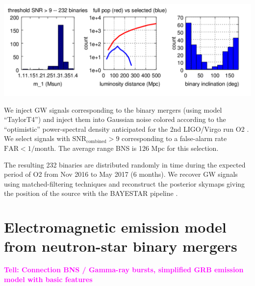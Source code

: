 \documentclass[a0,portrait]{a0poster}
\newcommand{\ECM}[1] {\textbf{\textcolor{magenta}{#1}}}
\begin{document}
\begin{multicols}{2}
\begin{center}\vspace{.5cm}
    \includegraphics[width=30cm]{figures/summary_plot.png}
\end{center}

We inject GW signals corresponding to the binary mergers (using model
``TaylorT4'') and inject them into Gaussian noise colored according to the
``optimistic'' power-spectral density anticipated for the 2nd LIGO/Virgo run O2
\cite{lrr-2016-1}. We select signals with $\mathrm{SNR}_{\mathrm{combined}} > 9$
corresponding to a false-alarm rate $\mathrm{FAR} < 1/\mathrm{month}$. The average range
BNS is 126 Mpc for this selection.

The resulting 232 binaries are distributed randomly in time during the expected
period of O2 from Nov 2016 to May 2017 (6 months). We recover GW signals using
matched-filtering techniques and reconstruct the posterior skymaps giving the
position of the source with the BAYESTAR pipeline \cite{PhysRevD.93.024013}.


\section*{Electromagnetic emission model from neutron-star binary mergers}

\ECM{Tell: Connection BNS / Gamma-ray bursts, simplified GRB emission model with basic features}


\end{multicols}
\end{document}
